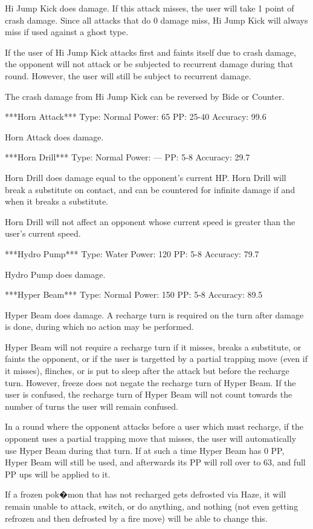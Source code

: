 \documentclass[reprint, aps, prl, paper=A4]{revtex4-1}
\begin{document}
Hi Jump Kick does damage. If this attack misses, the user will take 1 point of crash damage.
Since all attacks that do 0 damage miss, Hi Jump Kick will always miss if used against a ghost
type.

If the user of Hi Jump Kick attacks first and faints itself due to crash damage, the opponent
will not attack or be subjected to recurrent damage during that round. However, the user will
still be subject to recurrent damage.

The crash damage from Hi Jump Kick can be reversed by Bide or Counter.


***Horn Attack***
Type: Normal
Power: 65
PP: 25-40
Accuracy: 99.6%

Horn Attack does damage.


***Horn Drill***
Type: Normal
Power: ---
PP: 5-8
Accuracy: 29.7%

Horn Drill does damage equal to the opponent's current HP. Horn Drill will break a substitute
on contact, and can be countered for infinite damage if and when it breaks a substitute.

Horn Drill will not affect an opponent whose current speed is greater than the user's current
speed.


***Hydro Pump***
Type: Water
Power: 120
PP: 5-8
Accuracy: 79.7%

Hydro Pump does damage.


***Hyper Beam***
Type: Normal
Power: 150
PP: 5-8
Accuracy: 89.5%

Hyper Beam does damage. A recharge turn is required on the turn after damage is done, during
which no action may be performed.

Hyper Beam will not require a recharge turn if it misses, breaks a substitute, or faints the
opponent, or if the user is targetted by a partial trapping move (even if it misses), flinches,
or is put to sleep after the attack but before the recharge turn. However, freeze does not
negate the recharge turn of Hyper Beam. If the user is confused, the recharge turn of Hyper
Beam will not count towards the number of turns the user will remain confused.

In a round where the opponent attacks before a user which must recharge, if the opponent uses a
partial trapping move that misses, the user will automatically use Hyper Beam during that turn.
If at such a time Hyper Beam has 0 PP, Hyper Beam will still be used, and afterwards its PP
will roll over to 63, and full PP ups will be applied to it.

If a frozen pok�mon that has not recharged gets defrosted via Haze, it will remain unable to
attack, switch, or do anything, and nothing (not even getting refrozen and then defrosted by a
fire move) will be able to change this.
\end{document}
